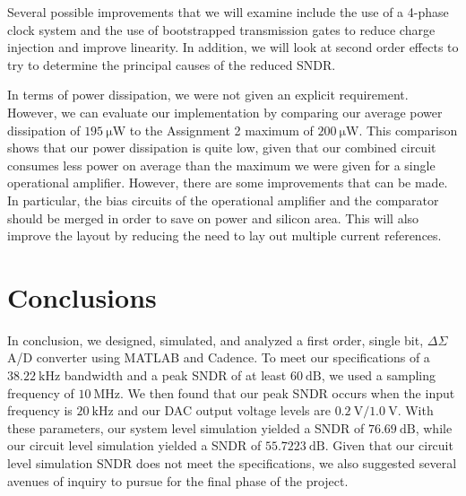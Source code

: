 \documentclass[journal,hidelinks]{IEEEtran}
\begin{document}
Several possible improvements that we will examine include the use of a 4-phase clock system and the use of bootstrapped transmission gates to reduce charge injection and improve linearity. In addition, we will look at second order effects to try to determine the principal causes of the reduced SNDR.

In terms of power dissipation, we were not given an explicit requirement. However, we can evaluate our implementation by comparing our average power dissipation of $\SI{195}{\micro\watt}$ to the Assignment 2 maximum of $\SI{200}{\micro\watt}$. This comparison shows that our power dissipation is quite low, given that our combined circuit consumes less power on average than the maximum we were given for a single operational amplifier. However, there are some improvements that can be made. In particular, the bias circuits of the operational amplifier and the comparator should be merged in order to save on power and silicon area. This will also improve the layout by reducing the need to lay out multiple current references.

\section{Conclusions}

In conclusion, we designed, simulated, and analyzed a first order, single bit, $\Delta \Sigma$ A/D converter using MATLAB and Cadence. To meet our specifications of a $\SI{38.22}{\kilo\hertz}$ bandwidth and a peak SNDR of at least $\SI{60}{\deci\bel}$, we used a sampling frequency of $\SI{10}{\mega\hertz}$. We then found that our peak SNDR occurs when the input frequency is $\SI{20}{\kilo\hertz}$ and our DAC output voltage levels are $\SI{0.2}{\volt}/\SI{1.0}{\volt}$. With these parameters, our system level simulation yielded a SNDR of $\SI{76.69}{\deci\bel}$, while our circuit level simulation yielded a SNDR of $\SI{55.7223}{\deci\bel}$. Given that our circuit level simulation SNDR does not meet the specifications, we also suggested several avenues of inquiry to pursue for the final phase of the project.



\end{document}
